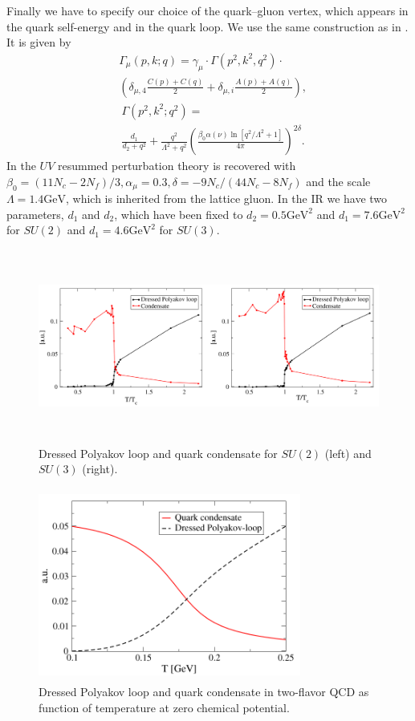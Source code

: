 \documentclass[a4paper,fleqn]{cls/cas-dc}
\begin{document}
Finally we have to specify our choice of the quark–gluon vertex, which appears in the quark self-energy and in the quark
loop. We use the same construction as in \cite{Fischer2010}. It is given by
\begin{equation}
\begin{split}
	&\Gamma_\mu(p, k; q) = \gamma_\mu \cdot \Gamma(p^2, k^2, q^2) \cdot \\
	& \left(\delta_{\mu, 4} \frac{C(p) + C(q)}{2} + \delta_{\mu, i} \frac{A(p) + A(q)}{2}\right),
	\end{split}
	\end{equation}\begin{equation}
	\begin{split}
	&\Gamma(p^2, k^2; q^2) = \\ 
	&\frac{d_1}{d_2 + q^2} + \frac{q^2}{\Lambda^2 + q^2}\left(\frac{\beta_0 \alpha(\nu) \ln [q^2 / \Lambda^2 + 1]}{4 \pi}\right)^{2 \delta}.
	\end{split}
\end{equation}
	In the $UV$ resummed perturbation theory is recovered with $\beta_0 = ( 11N_c - 2N_f )/ 3 , \alpha_\mu = 0.3 , \delta = - 9N_c /( 44N_c - 8N_f )$ and
	the scale $\Lambda = 1.4\text{GeV}$, which is inherited from the lattice gluon. In the IR we have two parameters, $d_1$ and $d_2$, which have
	been fixed to $d_2 = 0.5 \text{GeV}^2$ and $d_1 = 7.6 \text{GeV}^2$ for $SU(2)$ and $d_1 = 4.6 \text{GeV}^2$ for $SU(3)$.
	\begin{figure}
		\centering
		\includegraphics[width=\textwidth,height=2.5in]{fig/fig3.png}
		\caption{Dressed Polyakov loop and quark condensate for $SU ( 2 )$ (left) and $SU ( 3 )$ (right).}
		\label{FIG:3}
	\end{figure}
	\begin{figure}
		\centering
		\includegraphics[width=3.4in,height=2.5in]{fig/fig4.png}
		\caption{Dressed Polyakov loop and quark condensate in two-flavor QCD as function of temperature at zero chemical potential.}
		\label{FIG:4}
	\end{figure}
\end{document}
